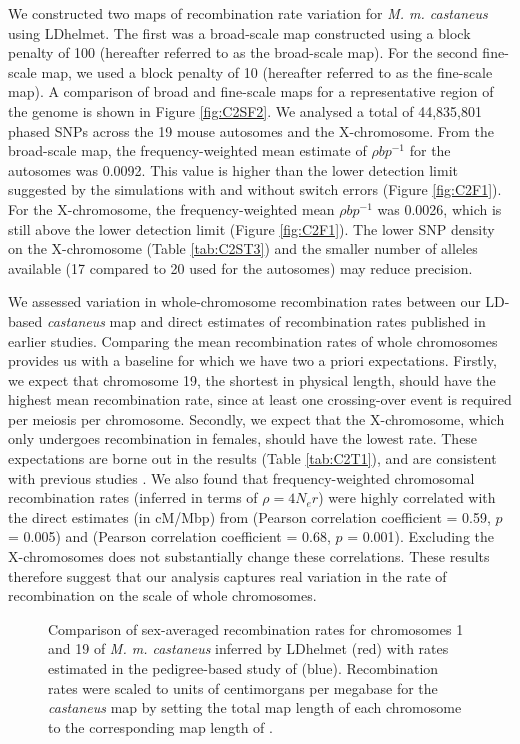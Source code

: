 We constructed two maps of recombination rate variation for \textit{M. m. castaneus} using LDhelmet. The first was a broad-scale map constructed using a block penalty of 100 (hereafter referred to as the broad-scale map). For the second fine-scale map, we used a block penalty of 10 (hereafter referred to as the fine-scale map). A comparison of broad and fine-scale maps for a representative region of the genome is shown in Figure \ref{fig:C2SF2}. We analysed a total of 44,835,801 phased SNPs across the 19 mouse autosomes and the X-chromosome. From the broad-scale map, the frequency-weighted mean estimate of $\rho bp^{-1}$ for the autosomes was 0.0092. This value is higher than the lower detection limit suggested by the simulations with and without switch errors (Figure \ref{fig:C2F1}). For the X-chromosome, the frequency-weighted mean $\rho bp^{-1}$ was 0.0026, which is still above the lower detection limit (Figure \ref{fig:C2F1}). The lower SNP density on the X-chromosome (Table \ref{tab:C2ST3}) and the smaller number of alleles available (17 compared to 20 used for the autosomes) may reduce precision. 
 
We assessed variation in whole-chromosome recombination rates between our LD-based \textit{castaneus} map and direct estimates of recombination rates published in earlier studies. Comparing the mean recombination rates of whole chromosomes provides us with a baseline for which we have two a priori expectations. Firstly, we expect that chromosome 19, the shortest in physical length, should have the highest mean recombination rate, since at least one crossing-over event is required per meiosis per chromosome. Secondly, we expect that the X-chromosome, which only undergoes recombination in females, should have the lowest rate. These expectations are borne out in the results (Table \ref{tab:C2T1}), and are consistent with previous studies \citep{RN184, RN232}. We also found that frequency-weighted chromosomal recombination rates (inferred in terms of $\rho = 4N_er$) were highly correlated with the direct estimates (in cM/Mbp) from \cite{RN184} (Pearson correlation coefficient = 0.59, $p$ = 0.005) and \cite{RN232} (Pearson correlation coefficient = 0.68, $p$ = 0.001). Excluding the X-chromosomes does not substantially change these correlations. These results therefore suggest that our analysis captures real variation in the rate of recombination on the scale of whole chromosomes. 


\begin{figure}[h]
   \centering      
   \noindent{}
 \caption[Comparison of LD-based and pedigree-based recombination maps]{Comparison of sex-averaged recombination rates for chromosomes 1 and 19 of \emph{M. m. castaneus} inferred by LDhelmet (red) with rates estimated in the pedigree-based study of \cite{RN232} (blue). Recombination rates were scaled to units of centimorgans per megabase for the \textit{castaneus} map by setting the total map length of each chromosome to the corresponding map length of \cite{RN232}.}
\label{fig:C2F2}

\end{figure}

